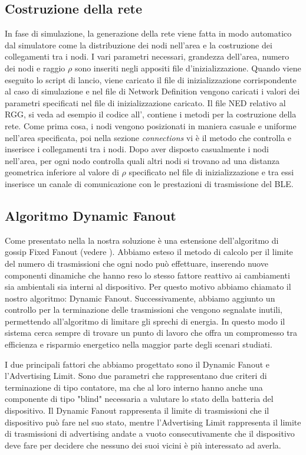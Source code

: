 \subsection{Costruzione della rete}
In fase di simulazione, la generazione della rete viene fatta in modo automatico dal simulatore come la distribuzione dei nodi nell'area e la costruzione dei collegamenti tra i nodi. I vari parametri necessari, grandezza dell'area, numero dei nodi e raggio $\rho$ sono inseriti negli appositi file d'inizializzazione. Quando viene eseguito lo script di lancio, viene caricato il file di inizializzazione corrispondente al caso di simulazione e nel file di Network Definition vengono caricati i valori dei parametri specificati nel file di inizializzazione caricato. Il file \acs{NED} relativo al \acs{RGG}, si veda ad esempio il codice all', contiene i metodi per la costruzione della rete. Come prima cosa, i nodi vengono posizionati in maniera casuale e uniforme nell'area specificata, poi nella sezione \textit{connections} vi è il metodo che controlla e inserisce i collegamenti tra i nodi. Dopo aver disposto casualmente i nodi nell'area, per ogni nodo controlla quali altri nodi si trovano ad una distanza geometrica inferiore al valore di $\rho$ specificato nel file di inizializzazione e tra essi inserisce un canale di comunicazione con le prestazioni di trasmissione del BLE.

\subsection{Algoritmo Dynamic Fanout}
Come presentato nella  la nostra soluzione è una estensione dell'algoritmo di gossip Fixed Fanout (vedere ). Abbiamo esteso il metodo di calcolo per il limite del numero di trasmissioni che ogni nodo può effettuare, inserendo nuove componenti dinamiche che hanno reso lo stesso fattore reattivo ai cambiamenti sia ambientali sia interni al dispositivo. Per questo motivo abbiamo chiamato il nostro algoritmo: Dynamic Fanout. Successivamente, abbiamo aggiunto un controllo per la terminazione delle trasmissioni che vengono segnalate inutili, permettendo all'algoritmo di limitare gli sprechi di energia. In questo modo il sistema cerca sempre di trovare un punto di lavoro che offra un compromesso tra efficienza e risparmio energetico nella maggior parte degli scenari studiati.

I due principali fattori che abbiamo progettato sono il Dynamic Fanout e l'Advertising Limit. Sono due parametri che rappresentano due criteri di terminazione di tipo contatore, ma che al loro interno hanno anche una componente di tipo "blind" necessaria a valutare lo stato della batteria del dispositivo. Il Dynamic Fanout rappresenta il limite di trasmissioni che il dispositivo può fare nel suo stato, mentre l'Advertising Limit rappresenta il limite di trasmissioni di advertising andate a vuoto consecutivamente che il dispositivo deve fare per decidere che nessuno dei suoi vicini è più interessato ad averla.

